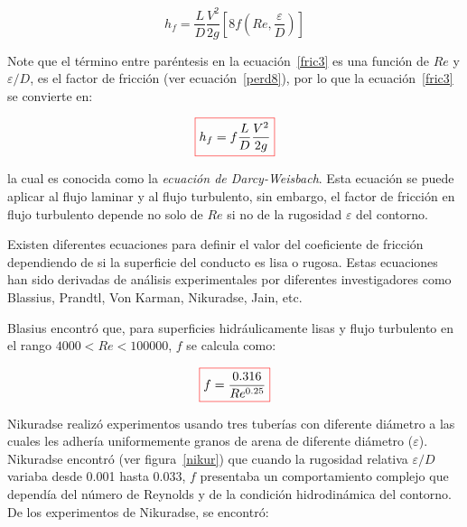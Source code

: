 \documentclass[11pt, oneside]{article}
\begin{document}
\begin{equation}
h_f = \frac{L}{D}\frac{V^2}{2g} \left[8 f \left(Re , \frac{\varepsilon}{D} \right) \right]
\label{fric3}
\end{equation}

Note que el t\'ermino entre par\'entesis en la ecuaci\'on~\ref{fric3} es una funci\'on de $Re$ y $\varepsilon/D$, es el factor de fricci\'on (ver ecuaci\'on~\ref{perd8}), por lo que la ecuaci\'on~\ref{fric3} se convierte en:

\begin{equation}
\color{red}\boxed{\color{black} h_f = f \frac{L}{D} \frac{V^2}{2g}}
\label{fric4}
\end{equation}

la cual es conocida como la \emph{ecuaci\'on de Darcy-Weisbach}. Esta ecuaci\'on se puede aplicar al flujo laminar y al flujo turbulento, sin embargo, el factor de fricci\'on en flujo turbulento depende no solo de $Re$ si no de la rugosidad $\varepsilon$ del contorno.

Existen diferentes  ecuaciones para definir el valor del coeficiente de fricci\'on dependiendo de si la superficie del conducto es lisa o rugosa. Estas ecuaciones han sido derivadas de an\'alisis experimentales por diferentes investigadores como Blassius, Prandtl, Von Karman, Nikuradse, Jain, etc.

Blasius encontr\'o que, para superficies hidr\'aulicamente lisas y flujo turbulento en el rango $4000 < Re < 100000$, $f$ se calcula como:

\begin{equation}
\color{red}\boxed{\color{black} f = \frac{0.316}{Re^{0.25}} }
\label{fric5}
\end{equation}

Nikuradse realiz\'o experimentos usando tres tuber\'ias con diferente di\'ametro a las cuales les adher\'ia uniformemente granos de arena de diferente di\'ametro ($\varepsilon$). Nikuradse encontr\'o (ver figura~\ref{nikur}) que cuando la rugosidad relativa $\varepsilon/D$ variaba desde 0.001 hasta 0.033, $f$ presentaba un comportamiento complejo que depend\'ia del n\'umero de Reynolds y de la condici\'on hidrodin\'amica del contorno. De los experimentos de Nikuradse, se encontr\'o:
\end{document}
